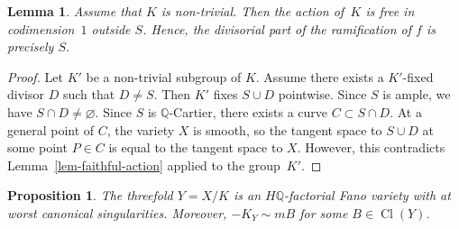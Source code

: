 \documentclass[10pt,a4paper]{article}
\newtheorem{proposition}[thm]{Proposition}
\newtheorem{lem}[thm]{Lemma}
\theoremstyle{definition}
\theoremstyle{remark}
\let\emptyset\varnothing
\DeclareMathOperator{\Cl}{Cl}
\begin{document}
\begin{lem}
\label{lem-for-thm-2}
Assume that $K$ is non-trivial. 
Then the action of\, $K$ is free in codimension~$1$ outside $S$. 
Hence, the divisorial part of the ramification of $f$ is precisely $S$. 
\end{lem}

\begin{proof}
Let $K'$ be a non-trivial subgroup of $K$. 
Assume there exists a $K'$-fixed divisor $D$ such that $D\neq S$. 
Then $K'$ fixes $S\cup D$ pointwise. 
Since $S$ is ample, we have $S\cap D\neq\emptyset$. Since $S$ is $\mathbb{Q}$-Cartier, there exists a curve $C\subset S\cap D$. At a general point of $C$, the variety $X$ is smooth, so the tangent space to $S\cup D$ at some point $P\in C$ is equal to the tangent space to $X$. However, this contradicts Lemma~\ref{lem-faithful-action} applied to the group~$K'$.
\end{proof}

\begin{proposition}
\label{prop-K3-boundedness}
The threefold $Y=X/K$ is an $H\mathbb{Q}$-factorial Fano variety with at worst canonical singularities. Moreover, $-K_Y\sim mB$ for some $B\in \Cl(Y)$.
\end{proposition}
\end{document}
